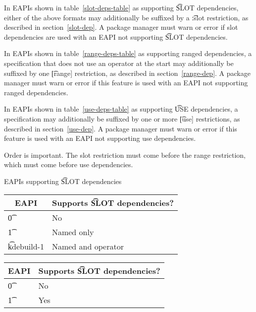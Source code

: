 In EAPIs shown in table~\ref{slot-deps-table} as supporting \t{SLOT} dependencies, either of the
above formats may additionally be suffixed by a \t{:slot} restriction, as described in
section~\ref{slot-dep}. A package manager must warn or error if slot dependencies are used with an
EAPI not supporting \t{SLOT} dependencies.

\IFKDEBUILDELSE
{
    In EAPIs shown in table~\ref{range-deps-table} as supporting ranged dependencies, a
    specification that does not use an operator at the start may additionally be suffixed by one
    \t{[range]} restriction, as described in section~\ref{range-dep}. A package manager must warn or
    error if this feature is used with an EAPI not supporting ranged dependencies.

    In EAPIs shown in table~\ref{use-deps-table} as supporting \t{USE} dependencies, a specification
    may additionally be suffixed by one or more \t{[use]} restrictions, as described in
    section~\ref{use-dep}. A package manager must warn or error if this feature is used with an EAPI
    not supporting use dependencies.

    \note Order is important. The slot restriction must come before the range restriction, which
    must come before use dependencies.
}{
}

\begin{centertable}{EAPIs supporting \t{SLOT} dependencies} \label{slot-deps-table}
\IFKDEBUILDELSE
{
    \begin{tabular}{ l l }
        \toprule
            \multicolumn{1}{c}{\textbf{EAPI}} &
            \multicolumn{1}{c}{\textbf{Supports \t{SLOT} dependencies?}} \\
            \midrule
    \t{0} & No \\
    \t{1} & Named only \\
    \t{kdebuild-1} & Named and operator \\
    \bottomrule
    \end{tabular}
}{
    \begin{tabular}{ l l }
        \toprule
            \multicolumn{1}{c}{\textbf{EAPI}} &
            \multicolumn{1}{c}{\textbf{Supports \t{SLOT} dependencies?}} \\
            \midrule
    \t{0} & No \\
    \t{1} & Yes \\
    \bottomrule
    \end{tabular}
}
\end{centertable}

